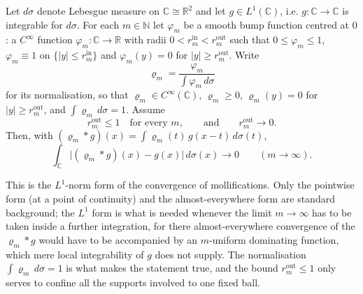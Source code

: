 \begin{helper}
Let $d\sigma$ denote Lebesgue measure on $\mathbb{C}\cong\mathbb{R}^{2}$ and
let $g\in L^{1}(\mathbb{C})$, i.e. $g\colon\mathbb{C}\to\mathbb{C}$ is
integrable for $d\sigma$.  For each $m\in\mathbb{N}$ let $\varphi_m$ be a
smooth bump function centred at $0$: a $C^\infty$ function
$\varphi_m\colon\mathbb{C}\to\mathbb{R}$ with radii
$0<r_m^{\mathrm{in}}<r_m^{\mathrm{out}}$ such that $0\le\varphi_m\le1$,
$\varphi_m\equiv1$ on $\{|y|\le r_m^{\mathrm{in}}\}$ and $\varphi_m(y)=0$ for
$|y|\ge r_m^{\mathrm{out}}$.  Write
\[
  \varrho_m=\frac{\varphi_m}{\int\varphi_m\,d\sigma}
\]
for its normalisation, so that $\varrho_m\in C^\infty(\mathbb{C})$,
$\varrho_m\ge0$, $\varrho_m(y)=0$ for $|y|\ge r_m^{\mathrm{out}}$, and
$\int\varrho_m\,d\sigma=1$.  Assume
\[
  r_m^{\mathrm{out}}\le1\quad\text{for every }m,
  \qquad\text{and}\qquad r_m^{\mathrm{out}}\longrightarrow0 .
\]
Then, with $(\varrho_m*g)(x)=\int\varrho_m(t)\,g(x-t)\,d\sigma(t)$,
\[
  \int_{\mathbb{C}}\bigl|(\varrho_m*g)(x)-g(x)\bigr|\,d\sigma(x)
  \longrightarrow0\qquad(m\to\infty).
\]

This is the $L^{1}$-norm form of the convergence of mollifications.  Only the
pointwise form (at a point of continuity) and the almost-everywhere form are
standard background; the $L^{1}$ form is what is needed whenever the limit
$m\to\infty$ has to be taken inside a further integration, for there
almost-everywhere convergence of the $\varrho_m*g$ would have to be
accompanied by an $m$-uniform dominating function, which mere local
integrability of $g$ does not supply.  The normalisation
$\int\varrho_m\,d\sigma=1$ is what makes the statement true, and the bound
$r_m^{\mathrm{out}}\le1$ only serves to confine all the supports involved to
one fixed ball.
\end{helper}
